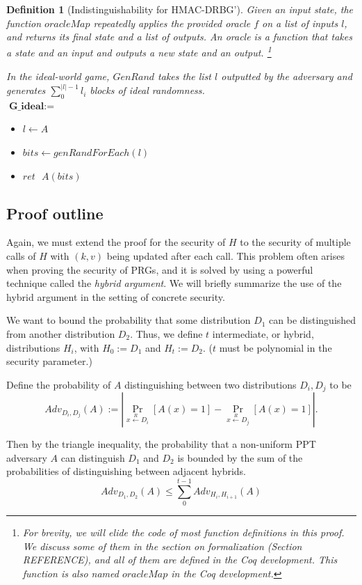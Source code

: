 \documentclass[12pt,lot, lof]{puthesis}
\newenvironment{game}
{ \begin{itemize}[noitemsep,nolistsep] 
}
{ \end{itemize}                  }
\newcommand{\s} {\textrm{ }}
\newtheorem{dfn}[thm]{Definition}
\begin{document}
{\begin{dfn}[Indistinguishability for HMAC-DRBG']
Given an input state, the function $oracleMap$ repeatedly applies the provided oracle $f$ on a list of inputs $l$, and returns its final state and a list of outputs. An oracle is a function that takes a state and an input and outputs a new state and an output. \footnote{For brevity, we will elide the code of most function definitions in this proof. We discuss some of them in the section on formalization (Section REFERENCE), and all of them are defined in the Coq development. This function is also named $oracleMap$ in the Coq development.}

In the ideal-world game, $GenRand$ takes the list $l$ outputted by the adversary and generates $\sum_0^{|l|-1} l_i$ blocks of ideal randomness.\\

$\textbf{G\_ideal} := $
\begin{game}
\item[] $l \leftarrow A$ 
\item[] $bits \leftarrow genRandForEach(l)$
\item[] $ret \s A(bits)$ \\
\end{game}
\end{dfn}

\subsection{Proof outline}
Again, we must extend the proof for the security of $H$ to the security of multiple calls of $H$ with $(k,v)$ being updated after each call. This problem often arises when proving the security of PRGs, and it is solved by using a powerful technique called the \emph{hybrid argument}. We will briefly summarize the use of the hybrid argument in the setting of concrete security.

We want to bound the probability that some distribution $D_1$ can be distinguished from another distribution $D_2$. Thus, we define $t$ intermediate, or hybrid, distributions $H_i$, with $H_0 := D_1$ and $H_t := D_2$. ($t$ must be polynomial in the security parameter.) 

Define the probability of $A$ distinguishing between two distributions $D_i, D_j$ to be 
$$Adv_{D_i, D_j}(A) := | \Pr_{x \xleftarrow{R} D_i} [A(x) = 1] - \Pr_{x \xleftarrow{R} D_j} [A(x) = 1] |.$$

Then by the triangle inequality, the probability that a non-uniform PPT adversary $A$ can distinguish $D_1$ and $D_2$ is bounded by the sum of the probabilities of distinguishing between adjacent hybrids.
$$Adv_{D_1, D_2}(A) \leq \sum_{0}^{t-1} Adv_{H_i, H_{i+1}}(A)$$

}
\end{document}
